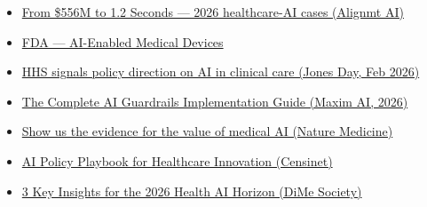 \documentclass[11pt,a4paper]{article}
\begin{document}
\begin{itemize}[leftmargin=1.2em]
  \item \href{https://www.alignmt.ai/post/from-556m-to-1-2-seconds-the-healthcare-ai-cases-that-changed-everything-in-2026}{From \$556M to 1.2 Seconds --- 2026 healthcare-AI cases (Alignmt AI)}
  \item \href{https://www.fda.gov/medical-devices/software-medical-device-samd/artificial-intelligence-enabled-medical-devices}{FDA --- AI-Enabled Medical Devices}
  \item \href{https://www.jonesday.com/en/insights/2026/02/hhs-signals-policy-direction-to-accelerate-adoption-of-ai-in-clinical-care}{HHS signals policy direction on AI in clinical care (Jones Day, Feb 2026)}
  \item \href{https://www.getmaxim.ai/articles/the-complete-ai-guardrails-implementation-guide-for-2026/}{The Complete AI Guardrails Implementation Guide (Maxim AI, 2026)}
  \item \href{https://www.nature.com/articles/s41591-026-04389-4}{Show us the evidence for the value of medical AI (Nature Medicine)}
  \item \href{https://censinet.com/perspectives/ai-policy-playbook-essential-guardrails-healthcare-innovation}{AI Policy Playbook for Healthcare Innovation (Censinet)}
  \item \href{https://dimesociety.org/newsroom/blog/3-key-insights-for-the-2026-health-ai-horizon/}{3 Key Insights for the 2026 Health AI Horizon (DiMe Society)}
\end{itemize}
\end{document}

